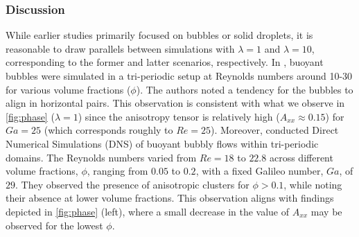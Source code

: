 \subsubsection*{Discussion}
While earlier studies primarily focused on bubbles or solid droplets, it is reasonable to draw parallels between simulations with $\lambda = 1$ and $\lambda = 10$, corresponding to the former and latter scenarios, respectively. In \citet{bunner2002dynamics}, buoyant bubbles were simulated in a tri-periodic setup at Reynolds numbers around 10-30 for various volume fractions ($\phi$). The authors noted a tendency for the bubbles to align in horizontal pairs. %
This observation is consistent with what we observe in \ref{fig:phase} ($\lambda = 1$) since the anisotropy tensor is relatively high ($A_{xx} \approx 0.15$) for $Ga = 25$ (which corresponds roughly to $Re = 25$). 
Moreover, \citet{zhang2021direct} conducted Direct Numerical Simulations (DNS) of buoyant bubbly flows within tri-periodic domains. The Reynolds numbers varied from $Re=18$ to $22.8$ across different volume fractions, $\phi$, ranging from $0.05$ to $0.2$, with a fixed Galileo number, $Ga$, of $29$. They observed the presence of anisotropic clusters for $\phi > 0.1$, while noting their absence at lower volume fractions. This observation aligns with findings depicted in \ref{fig:phase} (left), where a small decrease in the value of $A_{xx}$ may be observed for the lowest $\phi$.

